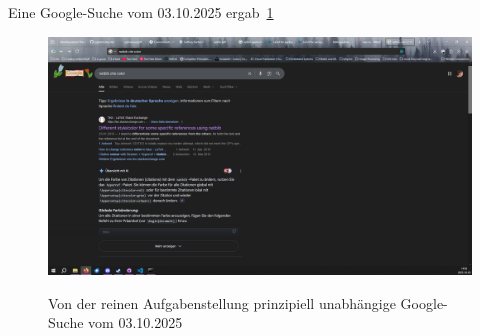 Eine Google-Suche vom 03.10.2025 ergab~\ref{fig:googlemakesmistakes}
\begin{figure}[h!tb]
    \centering
    \caption{Von der reinen Aufgabenstellung prinzipiell unabhängige Google-Suche vom 03.10.2025}
    \includegraphics[width=\textwidth]{pictures/motivation.PNG}\label{fig:googlemakesmistakes}
\end{figure}